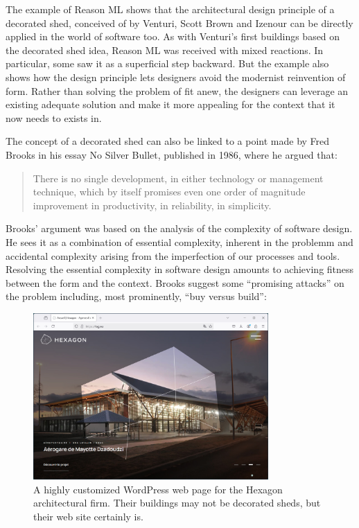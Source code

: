 The example of Reason ML shows that the architectural design principle of a decorated shed,
conceived of by Venturi, Scott Brown and Izenour can be directly applied in the world of software
too. As with Venturi's first buildings based on the decorated shed idea, Reason ML was received with
mixed reactions. In particular, some saw it as a superficial step backward. But the example also
shows how the design principle lets designers avoid the modernist reinvention of form. Rather than
solving the problem of fit anew, the designers can leverage an existing adequate solution and make
it more appealing for the context that it now needs to exists in.

The concept of a decorated shed can also be linked to a point made by Fred Brooks in his essay
No Silver Bullet, published in 1986, where he argued that:

\begin{quote}
There is no single development, in either technology or management technique, which by itself
promises even one order of magnitude improvement in productivity, in reliability, in
simplicity.
\end{quote}

Brooks' argument was based on the analysis of the complexity of software design. He sees it as a
combination of essential complexity, inherent in the problemm and accidental complexity arising
from the imperfection of our processes and tools. Resolving the essential complexity in software
design amounts to achieving fitness between the form and the context. Brooks suggest
some ``promising attacks'' on the problem including, most prominently, ``buy versus build'':

\begin{figure}
  \centering
  \includegraphics[width=0.8\textwidth]{fig/hexagon.jpg}
  \caption{A highly customized WordPress web page for the Hexagon architectural firm. Their
  buildings may not be decorated sheds, but their web site certainly is.}
  \label{fig:wordpress}
\end{figure}

